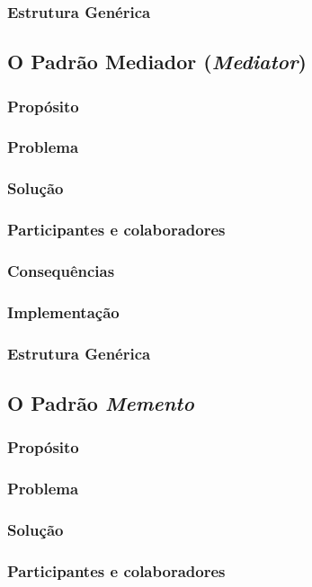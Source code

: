 \documentclass[
	11pt,				%
	openright,
	twoside,			%
	a4paper,			%
	english,			%
	french,
	brazil,				%
	sumario=tradicional
	]{abntex2}
\begin{document}
\subsubsection{Estrutura Genérica}

\subsection{O Padrão Mediador (\textit{Mediator})}
\subsubsection{Propósito}
\subsubsection{Problema}
\subsubsection{Solução}
\subsubsection{Participantes e colaboradores}
\subsubsection{Consequências}
\subsubsection{Implementação}
\subsubsection{Estrutura Genérica}

\subsection{O Padrão \textit{Memento}}
\subsubsection{Propósito}
\subsubsection{Problema}
\subsubsection{Solução}
\subsubsection{Participantes e colaboradores}
\end{document}
